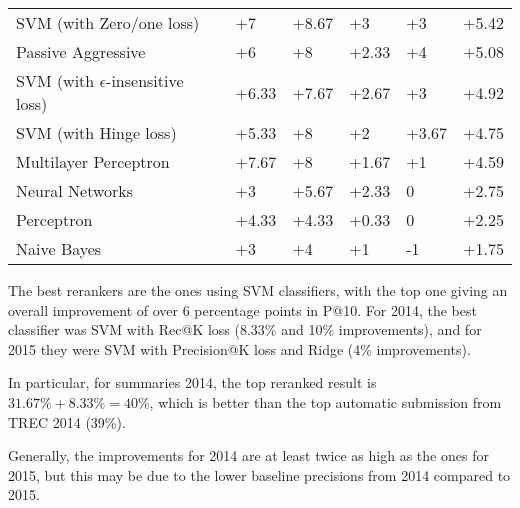 \begin{table}[h!]
{\begin{tabular}{@{}llllll@{}}
SVM (with Zero/one loss)            	& +7                       & +8.67                       & +3                       & +3                          & +5.42             \\
Passive Aggressive              	& +6                       & +8                          & +2.33                    & +4                          & +5.08             \\
SVM (with $\epsilon$-insensitive loss)	& +6.33                    & +7.67                       & +2.67                    & +3                          & +4.92             \\
SVM (with Hinge loss)              	& +5.33                    & +8                          & +2                       & +3.67                       & +4.75             \\
Multilayer Perceptron            	& +7.67                    & +8                          & +1.67                    & +1                          & +4.59             \\
Neural Networks                  	& +3                       & +5.67                       & +2.33                    & 0                           & +2.75             \\
Perceptron                          	& +4.33                    & +4.33                       & +0.33                    & 0                           & +2.25             \\
Naive Bayes                        	& +3                       & +4                          & +1                       & -1                          & +1.75             \\ \bottomrule
\end{tabular}%
}
\end{table}

The best rerankers are the ones using SVM classifiers, with the top one giving an overall improvement of over 6 percentage
points in P@10. For 2014, the best classifier was SVM with Rec@K loss (8.33\% and 10\% improvements),
and for 2015 they were SVM with Precision@K loss and Ridge (4\% improvements).

In particular, for summaries 2014, the top reranked result is $31.67\%+8.33\% = 40\%$, which is better than the top automatic submission
from TREC 2014 (39\%).

Generally, the improvements for 2014 are at least
twice as high as the ones for 2015, but this may be due to the lower baseline precisions from 2014 compared to 2015.

